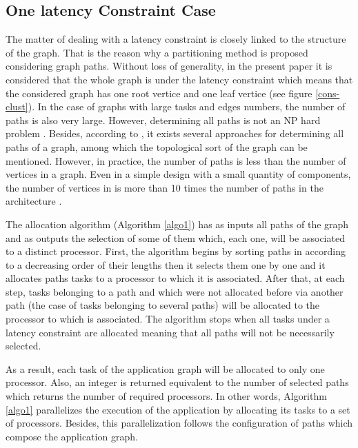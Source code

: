 \documentclass{ijcaArticle}
\begin{document}
\subsection{One latency Constraint Case}

The matter of dealing with a latency
constraint is closely linked to the structure of the graph. That is the reason why a partitioning method is proposed considering graph paths. Without loss of generality, in the present paper it is considered that the whole graph is under the latency constraint  which means that the considered graph has one root vertice  and one leaf vertice  (see figure \ref{cons-clust}). In the case of graphs with large tasks and edges numbers, the number of paths is also very large. However, determining all paths is not an NP hard problem \cite{VisSchKonBor10}. Besides, according to \cite{Tutzauer2007}, it exists several approaches for determining all paths of a graph, among which the topological sort of the graph can be mentioned. However, in practice, the number of paths is less than the number of vertices in a graph. Even in a simple design with a small quantity of components, the number of vertices in  is more than 10 times the number of paths in the architecture \cite{YuchunMa:2007}. 



The allocation algorithm (Algorithm \ref{algo1}) has as inputs all paths of the graph and as outputs the selection of some of them which, each one, will be associated to a distinct processor. First, the algorithm begins by sorting paths in  according to a decreasing order of their lengths then it selects them one by one and it allocates paths tasks to a processor to which it is associated. After that, at each step, tasks belonging to a path  and which were not allocated before via another path (the case of tasks belonging to several paths) will be allocated to the processor to which  is associated. The algorithm stops when all tasks under a latency constraint are allocated meaning that all paths will not be necessarily selected.   

As a result, each task of the application graph will be allocated to only one processor. Also, an integer  is returned equivalent to the number of selected paths which returns 
the number of required processors. In other words, Algorithm \ref{algo1} parallelizes the execution of the application by allocating its tasks to a set of processors. Besides, this parallelization follows the configuration of paths which compose the application graph.    
\end{document}
